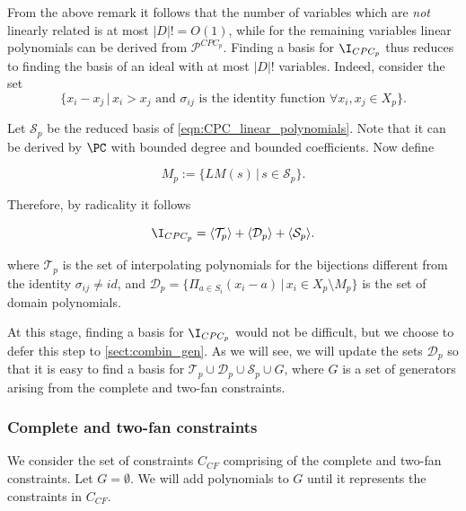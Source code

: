 \documentclass[11pt]{article}
\begin{document}
From the above remark it follows that the number of variables which are \textit{not} linearly related is at most $|D|! = O(1)$, while for the remaining variables linear polynomials can be derived from $\mathcal{P}^{CPC_p}$. Finding a \GB basis for $\I_{CPC_p}$ thus reduces to finding the \GB basis of an ideal with at most $|D|!$ variables. Indeed, consider the set
\begin{equation}\label{eqn:CPC_linear_polynomials}
    \{ x_i - x_j \, | \, x_i > x_j \text{ and } \sigma_{ij} \text{ is the identity function } \forall x_i, x_j \in X_p \}.
\end{equation}

Let $\mathcal{S}_p$ be the reduced \GB basis of \cref{eqn:CPC_linear_polynomials}. Note that it can be derived by $\PC$ with bounded degree and bounded coefficients. Now define

\begin{equation*}
    M_p := \{LM(s) \, | \, s \in \mathcal{S}_p\}.
\end{equation*}

Therefore, by radicality it follows

\begin{equation}\label{eqn:dual_discriminator_CPC_decomposition}
    \I_{CPC_p} = \langle \mathcal{T}_p \rangle + \langle \mathcal{D}_p \rangle + \langle \mathcal{S}_p \rangle.
\end{equation}

where $\mathcal{T}_p$ is the set of interpolating polynomials for the bijections different from the identity $\sigma_{ij} \neq id$, and $\mathcal{D}_p = \{ \Pi_{a \in S_i}(x_i - a) \, | \, x_i \in X_p \setminus M_p\}$ is the set of domain polynomials.

At this stage, finding a \GB basis for $\I_{CPC_p}$ would not be difficult, but we choose to defer this step to \cref{sect:combin_gen}. As we will see, we will update the sets $\mathcal{D}_p$ so that it is easy to find a \GB basis for $\mathcal{T}_p \cup \mathcal{D}_p \cup \mathcal{S}_p \cup G$, where $G$ is a set of generators arising from the complete and two-fan constraints.

\subsubsection{Complete and two-fan constraints}\label{sect:complete_two-fan_constraints}

We consider the set of constraints $C_{CF}$ comprising of the complete and two-fan constraints. Let $G = \emptyset$. We will add polynomials to $G$ until it represents the constraints in $C_{CF}$.
\end{document}
